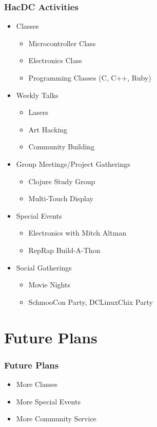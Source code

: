 \documentclass[notes]{beamer}
\begin{document}
\begin{frame}
  \frametitle{HacDC Activities}
  \begin{itemize}
  \item Classes
    \begin{itemize}
    \item Microcontroller Class
    \item Electronics Class
    \item Programming Classes (C, C++, Ruby)
    \end{itemize}
  \item Weekly Talks
    \begin{itemize}
    \item Lasers
    \item Art Hacking
    \item Community Building
    \end{itemize}
  \item Group Meetings/Project Gatherings
    \begin{itemize}
    \item Clojure Study Group
    \item Multi-Touch Display
    \end{itemize}
  \item Special Events
    \begin{itemize}
    \item Electronics with Mitch Altman
    \item RepRap Build-A-Thon
    \end{itemize}
  \item Social Gatherings
   
   \begin{itemize}
   \item Movie Nights
   \item SchmooCon Party, DCLinuxChix Party
   \end{itemize}
  \end{itemize}
\end{frame}

\section{Future Plans}

\begin{frame}
  \frametitle{Future Plans}
  \begin{itemize}
  \item More Classes
  \item More Special Events
  \item More Community Service
  \end{itemize}
\end{frame}
\end{document}
